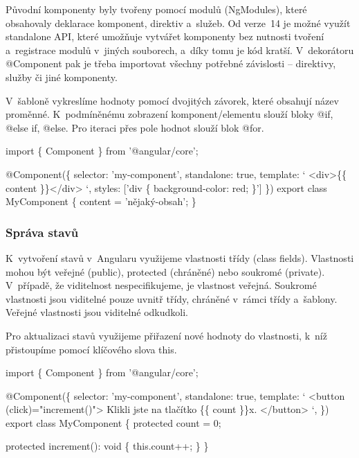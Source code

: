 Původní komponenty byly tvořeny pomocí modulů (NgModules), které obsahovaly deklarace komponent, direktiv a~služeb. 
Od verze~14 je možné využít standalone API, které umožňuje vytvářet komponenty bez nutnosti tvoření a~registrace modulů v~jiných souborech, a~díky tomu je kód kratší. 
V~dekorátoru @Component pak je třeba importovat všechny potřebné závislosti -- direktivy, služby či jiné komponenty.\cite{angulardev,learningangular}

V~šabloně vykreslíme hodnoty pomocí dvojitých závorek, které obsahují název proměnné. K~podmíněnému zobrazení komponent/elementu slouží bloky @if, @else if, @else. 
Pro iteraci přes pole hodnot slouží blok @for.\cite{angulardev}

\begin{prog}
import \{ Component \} from '@angular/core';

@Component(\{
  selector: 'my-component',
  standalone: true,
  template: `
    <div>\{\{ content \}\}</div>
  `,
  styles: ['div \{ background-color: red; \}']
\})
export class MyComponent \{
  content = 'nějaký-obsah';
\}
\end{prog}

\subsubsection{Správa stavů}

K~vytvoření stavů v~Angularu využijeme vlastnosti třídy (class fields). Vlastnosti mohou být veřejné (public), protected (chráněné) nebo soukromé (private). 
V~případě, že viditelnost nespecifikujeme, je vlastnost veřejná. Soukromé vlastnosti jsou viditelné pouze uvnitř třídy, chráněné v~rámci třídy a~šablony. 
Veřejné vlastnosti jsou viditelné odkudkoli.\cite{angulardev,learningangular}

Pro aktualizaci stavů využijeme přiřazení nové hodnoty do vlastnosti, k~níž přistoupíme pomocí klíčového slova this.\cite{angulardev}

\begin{prog}
import \{ Component \} from '@angular/core';

@Component(\{
  selector: 'my-component',
  standalone: true,
  template: `
    <button (click)="increment()">
      Klikli jste na tlačítko \{\{ count \}\}x.
    </button>
  `,
\})
export class MyComponent \{
  protected count = 0;

  protected increment(): void \{
    this.count++;
  \}
\}
\end{prog}

